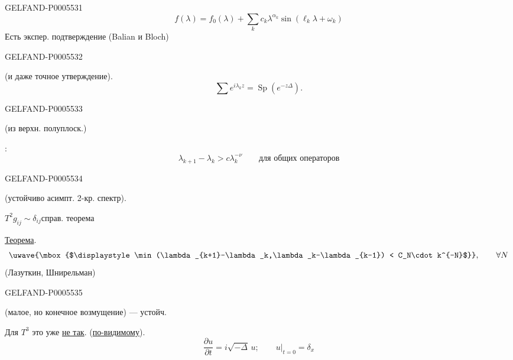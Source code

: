 \begin{GelfandAdjacentEvidence}{GELFAND-P000553}{1}
\[
f(\lambda)=f_0(\lambda)+\sum_k c_k\lambda^{\alpha_k}
\sin(\ell_k\lambda+\omega_k)
\]
Есть экспер. подтверждение (Balian и Bloch)
\end{GelfandAdjacentEvidence}
\begin{GelfandAdjacentEvidence}{GELFAND-P000553}{2}

(и даже точное утверждение).
\[
\sum e^{i\lambda_k z}=\operatorname{Sp}(e^{-z\Delta}).
\]
\end{GelfandAdjacentEvidence}
\begin{GelfandAdjacentEvidence}{GELFAND-P000553}{3}

 (из верхн. полуплоск.)

:
\[
\lambda_{k+1}-\lambda_k>c\lambda_k^{-\nu}
\qquad\text{для общих операторов}
\]
\end{GelfandAdjacentEvidence}
\begin{GelfandAdjacentEvidence}{GELFAND-P000553}{4}

 (устойчиво асимпт. 2-кр. спектр).

\(T^2\)\qquad \(g_{ij}\sim\delta_{ij}\)\qquad справ. теорема

\uline{Теорема}.
\[
\uwave{\mbox{$\displaystyle\min(\lambda_{k+1}-\lambda_k,\lambda_k-\lambda_{k-1})
< C_N\cdot k^{-N}$}},\qquad \forall N
\]
(Лазуткин, Шнирельман)
\end{GelfandAdjacentEvidence}
\begin{GelfandAdjacentEvidence}{GELFAND-P000553}{5}

(малое, но конечное возмущение) — устойч.

Для \(T^3\) это уже \uline{не так}. (\uline{по-видимому}).
\[
\frac{\partial u}{\partial t}=i\sqrt{-\Delta}\,u;\qquad
\left.u\right|_{t=0}=\delta_x
\]
\end{GelfandAdjacentEvidence}
